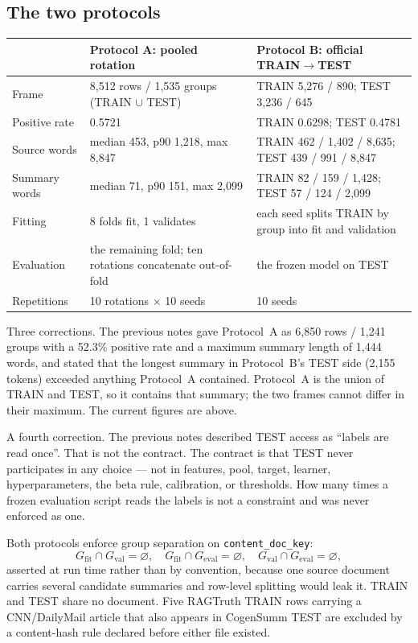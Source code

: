 \documentclass[10pt,a4paper]{article}
\newcommand{\fix}[1]{\textcolor{red!65!black}{#1}}
\begin{document}
\subsection{The two protocols}

\begin{center}\small
\begin{tabular}{p{3.2cm}p{5.5cm}p{5.5cm}}
\toprule
 & \textbf{Protocol A: pooled rotation} & \textbf{Protocol B: official TRAIN$\to$TEST} \\
\midrule
Frame & \fix{8{,}512 rows / 1{,}535 groups} (TRAIN $\cup$ TEST) &
  TRAIN 5{,}276 / 890; TEST 3{,}236 / 645 \\
Positive rate & \fix{0.5721} & TRAIN 0.6298; TEST 0.4781 \\
Source words & median 453, p90 1{,}218, max 8{,}847 &
  TRAIN 462 / 1{,}402 / 8{,}635; TEST 439 / 991 / 8{,}847 \\
Summary words & median 71, p90 151, \fix{max 2{,}099} &
  TRAIN 82 / 159 / 1{,}428; TEST 57 / 124 / 2{,}099 \\
Fitting & 8 folds fit, 1 validates & each seed splits TRAIN by group into fit and validation \\
Evaluation & the remaining fold; ten rotations concatenate out-of-fold & the frozen model on TEST \\
Repetitions & 10 rotations $\times$ 10 seeds & 10 seeds \\
\bottomrule
\end{tabular}
\end{center}

\fix{Three corrections.} The previous notes gave Protocol~A as 6{,}850 rows / 1{,}241 groups with
a 52.3\% positive rate and a maximum summary length of 1{,}444 words, and stated that the
longest summary in Protocol~B's TEST side (2{,}155 tokens) exceeded anything Protocol~A
contained. Protocol~A is the union of TRAIN and TEST, so it contains that summary; the two
frames cannot differ in their maximum. The current figures are above.

\fix{A fourth correction.} The previous notes described TEST access as ``labels are read once''.
That is not the contract. The contract is that TEST never participates in any choice --- not in
features, pool, target, learner, hyperparameters, the beta rule, calibration, or thresholds.
How many times a frozen evaluation script reads the labels is not a constraint and was never
enforced as one.

Both protocols enforce group separation on \texttt{content\_doc\_key}:
\[
G_{\mathrm{fit}}\cap G_{\mathrm{val}}=\varnothing,\quad
G_{\mathrm{fit}}\cap G_{\mathrm{eval}}=\varnothing,\quad
G_{\mathrm{val}}\cap G_{\mathrm{eval}}=\varnothing,
\]
asserted at run time rather than by convention, because one source document carries several
candidate summaries and row-level splitting would leak it. TRAIN and TEST share no document.
Five RAGTruth TRAIN rows carrying a CNN/DailyMail article that also appears in CogenSumm TEST are
excluded by a content-hash rule declared before either file existed.
\end{document}
